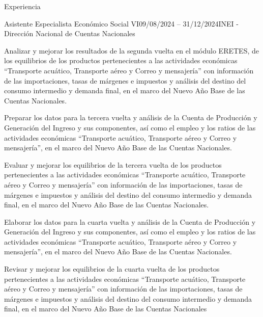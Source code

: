 \documentclass[
11pt, %
]{resume} %
\begin{document}
	\begin{rSection}{Experiencia}

		\begin{rSubsection}{Asistente Especialista Económico Social VI}{09/08/2024 – 31/12/2024}{INEI - Dirección Nacional de Cuentas Nacionales}{}
			
			\item  Analizar y mejorar los resultados de la segunda vuelta en el módulo ERETES, de los equilibrios de los productos pertenecientes a las actividades económicas “Transporte acuático, Transporte aéreo y Correo y mensajería” con información de las importaciones, tasas de márgenes e impuestos y análisis del destino del consumo intermedio y demanda final, en el marco del Nuevo Año Base de las Cuentas Nacionales.
            \item  Preparar los datos para la tercera vuelta y análisis de la Cuenta de Producción y Generación del Ingreso y sus componentes, así como el empleo y los ratios de las actividades económicas “Transporte acuático, Transporte aéreo y Correo y mensajería”, en el marco del Nuevo Año Base de las Cuentas Nacionales.
            \item Evaluar y mejorar los equilibrios de la tercera vuelta de los productos pertenecientes a las actividades económicas “Transporte acuático, Transporte aéreo y Correo y mensajería” con información de las importaciones, tasas de márgenes e impuestos y análisis del destino del consumo intermedio y demanda final, en el marco del Nuevo Año Base de las Cuentas Nacionales.
            \item Elaborar los datos para la cuarta vuelta y análisis de la Cuenta de Producción y Generación del Ingreso y sus componentes, así como el empleo y los ratios de las actividades económicas “Transporte acuático, Transporte aéreo y Correo y mensajería”, en el marco del Nuevo Año Base de las Cuentas Nacionales.
            \item Revisar y mejorar los equilibrios de la cuarta vuelta de los productos pertenecientes a las actividades económicas “Transporte acuático, Transporte aéreo y Correo y mensajería” con información de las importaciones, tasas de márgenes e impuestos y análisis del destino del consumo intermedio y demanda final, en el marco del Nuevo Año Base de las Cuentas Nacionales
			
		\end{rSubsection}
		


\end{rSection}
\end{document}
